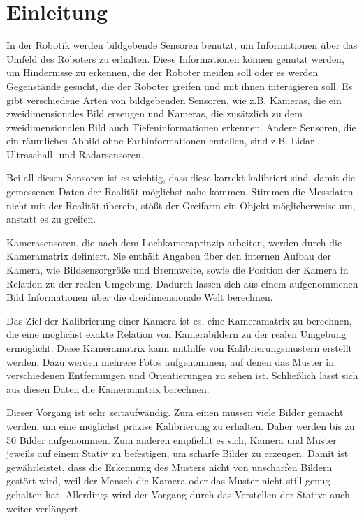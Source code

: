 \chapter{Einleitung}

In der Robotik werden bildgebende Sensoren benutzt, um Informationen über das Umfeld des Roboters zu erhalten. Diese Informationen können genutzt werden, um Hindernisse zu erkennen, die der Roboter meiden soll oder es werden Gegenstände gesucht, die der Roboter greifen und mit ihnen interagieren soll. Es gibt verschiedene Arten von bildgebenden Sensoren, wie z.B. Kameras, die ein zweidimensionales Bild erzeugen und Kameras, die zusätzlich zu dem zweidimensionalen Bild auch Tiefeninformationen erkennen. Andere Sensoren, die ein räumliches Abbild ohne Farbinformationen erstellen, sind z.B. Lidar-, Ultraschall- und Radarsensoren.

Bei all diesen Sensoren ist es wichtig, dass diese korrekt kalibriert sind, damit die gemessenen Daten der Realität möglichst nahe kommen. Stimmen die Messdaten nicht mit der Realität überein, stößt der Greifarm ein Objekt möglicherweise um, anstatt es zu greifen.

Kamerasensoren, die nach dem Lochkameraprinzip arbeiten, werden durch die Kameramatrix definiert. Sie enthält Angaben über den internen Aufbau der Kamera, wie Bildsensorgröße und Brennweite, sowie die Position der Kamera in Relation zu der realen Umgebung. Dadurch lassen sich aus einem aufgenommenen Bild Informationen über die dreidimensionale Welt berechnen. 

Das Ziel der Kalibrierung einer Kamera ist es, eine Kameramatrix zu berechnen, die eine möglichst exakte Relation von Kamerabildern zu der realen Umgebung ermöglicht. Diese Kameramatrix kann mithilfe von Kalibrierungsmustern erstellt werden. Dazu werden mehrere Fotos aufgenommen, auf denen das Muster in verschiedenen Entfernungen und Orientierungen zu sehen ist. Schließlich lässt sich aus diesen Daten die Kameramatrix berechnen.

Dieser Vorgang ist sehr zeitaufwändig. Zum einen müssen viele Bilder gemacht werden, um eine möglichst präzise Kalibrierung zu erhalten. Daher werden bis zu 50 Bilder aufgenommen. Zum anderen empfiehlt es sich, Kamera und Muster jeweils auf einem Stativ zu befestigen, um scharfe Bilder zu erzeugen. Damit ist gewährleistet, dass die Erkennung des Musters nicht von unscharfen Bildern gestört wird, weil der Mensch die Kamera oder das Muster nicht still genug gehalten hat. Allerdings wird der Vorgang durch das Verstellen der Stative auch weiter verlängert.

